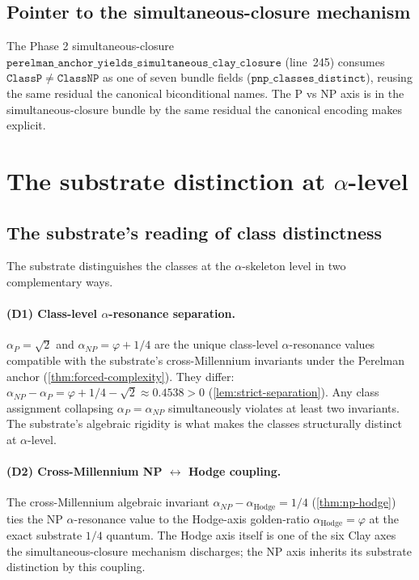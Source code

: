 \documentclass[11pt,a4paper]{article}
\theoremstyle{plain}
\theoremstyle{definition}
\begin{document}
\subsection{Pointer to the simultaneous-closure mechanism}
\label{sec:pointer-simul}

The Phase 2 simultaneous-closure
$\mathtt{perelman\_anchor\_yields\_simultaneous\_clay\_closure}$
(line~245) consumes
$\mathtt{ClassP} \neq \mathtt{ClassNP}$ as one of seven bundle fields
($\mathtt{pnp\_classes\_distinct}$), reusing the same residual the
canonical biconditional names. The P vs NP axis is in the
simultaneous-closure bundle by the same residual the canonical
encoding makes explicit.

\section{The substrate distinction at $\alpha$-level}
\label{sec:distinction}

\subsection{The substrate's reading of class distinctness}
\label{sec:substrate-reading}

The substrate distinguishes the classes at the $\alpha$-skeleton level
in two complementary ways.

\paragraph{(D1) Class-level $\alpha$-resonance separation.}
$\alpha_{P} = \sqrt{2}$ and $\alpha_{NP} = \varphi + 1/4$ are the
unique class-level $\alpha$-resonance values compatible with the
substrate's cross-Millennium invariants under the Perelman anchor
(\cref{thm:forced-complexity}). They differ:
$\alpha_{NP} - \alpha_{P} = \varphi + 1/4 - \sqrt{2} \approx 0.4538 > 0$
(\cref{lem:strict-separation}). Any class assignment collapsing
$\alpha_{P} = \alpha_{NP}$ simultaneously violates at least two
invariants. The substrate's algebraic rigidity is what makes the
classes structurally distinct at $\alpha$-level.

\paragraph{(D2) Cross-Millennium NP $\leftrightarrow$ Hodge coupling.}
The cross-Millennium algebraic invariant
$\alpha_{NP} - \alpha_{\mathrm{Hodge}} = 1/4$
(\cref{thm:np-hodge}) ties the NP $\alpha$-resonance value to the
Hodge-axis golden-ratio $\alpha_{\mathrm{Hodge}} = \varphi$ at the
exact substrate $1/4$ quantum. The Hodge axis itself is one of the
six Clay axes the simultaneous-closure mechanism discharges; the NP
axis inherits its substrate distinction by this coupling.
\end{document}
